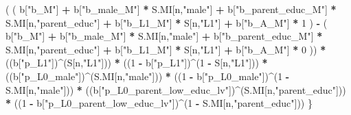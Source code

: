 \documentclass[
]{book}
\newenvironment{Shaded}{\begin{snugshade}}{\end{snugshade}}
\newcommand{\DecValTok}[1]{\textcolor[rgb]{0.00,0.00,0.81}{#1}}
\newcommand{\NormalTok}[1]{#1}
\newcommand{\SpecialCharTok}[1]{\textcolor[rgb]{0.81,0.36,0.00}{\textbf{#1}}}
\newcommand{\StringTok}[1]{\textcolor[rgb]{0.31,0.60,0.02}{#1}}
\begin{document}
\begin{Shaded}
\begin{Highlighting}[]
\NormalTok{      ( ( b[}\StringTok{"b\_M"}\NormalTok{] }\SpecialCharTok{+} 
\NormalTok{            b[}\StringTok{"b\_male\_M"}\NormalTok{] }\SpecialCharTok{*}\NormalTok{ S.MI[n,}\StringTok{"male"}\NormalTok{] }\SpecialCharTok{+} 
\NormalTok{            b[}\StringTok{"b\_parent\_educ\_M"}\NormalTok{] }\SpecialCharTok{*}\NormalTok{ S.MI[n,}\StringTok{"parent\_educ"}\NormalTok{] }\SpecialCharTok{+} 
\NormalTok{            b[}\StringTok{"b\_L1\_M"}\NormalTok{] }\SpecialCharTok{*}\NormalTok{ S[n,}\StringTok{"L1"}\NormalTok{] }\SpecialCharTok{+}
\NormalTok{            b[}\StringTok{"b\_A\_M"}\NormalTok{] }\SpecialCharTok{*} \DecValTok{1}\NormalTok{ ) }\SpecialCharTok{{-}} 
\NormalTok{          ( b[}\StringTok{"b\_M"}\NormalTok{] }\SpecialCharTok{+} 
\NormalTok{              b[}\StringTok{"b\_male\_M"}\NormalTok{] }\SpecialCharTok{*}\NormalTok{ S.MI[n,}\StringTok{"male"}\NormalTok{] }\SpecialCharTok{+} 
\NormalTok{              b[}\StringTok{"b\_parent\_educ\_M"}\NormalTok{] }\SpecialCharTok{*}\NormalTok{ S.MI[n,}\StringTok{"parent\_educ"}\NormalTok{] }\SpecialCharTok{+} 
\NormalTok{              b[}\StringTok{"b\_L1\_M"}\NormalTok{] }\SpecialCharTok{*}\NormalTok{ S[n,}\StringTok{"L1"}\NormalTok{] }\SpecialCharTok{+}
\NormalTok{              b[}\StringTok{"b\_A\_M"}\NormalTok{] }\SpecialCharTok{*} \DecValTok{0}\NormalTok{ )) }\SpecialCharTok{*} 
\NormalTok{      ((b[}\StringTok{"p\_L1"}\NormalTok{])}\SpecialCharTok{\^{}}\NormalTok{(S[n,}\StringTok{"L1"}\NormalTok{])) }\SpecialCharTok{*}
\NormalTok{      ((}\DecValTok{1} \SpecialCharTok{{-}}\NormalTok{ b[}\StringTok{"p\_L1"}\NormalTok{])}\SpecialCharTok{\^{}}\NormalTok{(}\DecValTok{1} \SpecialCharTok{{-}}\NormalTok{ S[n,}\StringTok{"L1"}\NormalTok{])) }\SpecialCharTok{*}
\NormalTok{      ((b[}\StringTok{"p\_L0\_male"}\NormalTok{])}\SpecialCharTok{\^{}}\NormalTok{(S.MI[n,}\StringTok{"male"}\NormalTok{])) }\SpecialCharTok{*} 
\NormalTok{      ((}\DecValTok{1} \SpecialCharTok{{-}}\NormalTok{ b[}\StringTok{"p\_L0\_male"}\NormalTok{])}\SpecialCharTok{\^{}}\NormalTok{(}\DecValTok{1} \SpecialCharTok{{-}}\NormalTok{ S.MI[n,}\StringTok{"male"}\NormalTok{])) }\SpecialCharTok{*} 
\NormalTok{      ((b[}\StringTok{"p\_L0\_parent\_low\_educ\_lv"}\NormalTok{])}\SpecialCharTok{\^{}}\NormalTok{(S.MI[n,}\StringTok{"parent\_educ"}\NormalTok{])) }\SpecialCharTok{*}
\NormalTok{      ((}\DecValTok{1} \SpecialCharTok{{-}}\NormalTok{ b[}\StringTok{"p\_L0\_parent\_low\_educ\_lv"}\NormalTok{])}\SpecialCharTok{\^{}}\NormalTok{(}\DecValTok{1} \SpecialCharTok{{-}}\NormalTok{ S.MI[n,}\StringTok{"parent\_educ"}\NormalTok{])) }
\NormalTok{    \}}
  

\end{Highlighting}
\end{Shaded}
\end{document}
